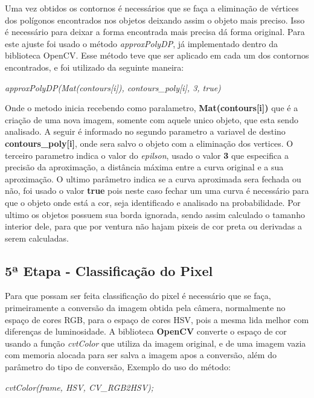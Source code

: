Uma vez obtidos os contornos é necessários que se faça a eliminação de vértices dos polígonos encontrados nos objetos deixando assim o objeto mais preciso. Isso é necessário para deixar a forma encontrada mais precisa dá forma original. Para este ajuste foi usado o método \textit{approxPolyDP}, já implementado dentro da biblioteca OpenCV. Esse método teve que ser aplicado em cada um dos contornos encontrados, e foi utilizado da seguinte maneira:
\begin{center}
\centering \textit{    approxPolyDP(Mat(contours[i]), contours\_poly[i], 3, true)}
\end{center}
 Onde o metodo inicia recebendo como paralametro, \textbf{Mat(contours[i])} que é a criação de uma nova imagem, somente com aquele unico objeto, que esta sendo analisado. A seguir é informado no segundo parametro a variavel de destino \textbf{contours\_poly[i]}, onde sera salvo o objeto com a eliminação dos vertices. O terceiro parametro indica o valor do \textit{epilson}, usado o valor \textbf{3} que especifica a precisão da aproximação, a distância máxima entre a curva original e a sua aproximação\cite{OpenCV}. O ultimo parâmetro indica se a curva aproximada sera fechada ou não, foi usado o valor \textbf{true} pois neste caso fechar um uma curva é necessário para que o objeto onde está a cor, seja identificado e analisado na probabilidade.
 Por ultimo os objetos possuem sua borda ignorada, sendo assim calculado o tamanho interior dele, para que por ventura não hajam pixeis de cor preta ou derivadas a serem calculadas.
 
 \subsection{5ª Etapa - Classificação do Pixel}

 
 
 Para que possam ser feita classificação do pixel é necessário que se faça, primeiramente a conversão da imagem obtida pela câmera, normalmente no espaço de cores RGB, para o espaço de cores HSV, pois a mesma lida melhor com diferenças de luminosidade. 
 A biblioteca \textbf{OpenCV} converte o espaço de cor usando a função \textit{cvtColor} que utiliza da imagem original, e de uma imagem vazia com memoria alocada para ser salva a imagem apos a conversão, além do parâmetro do tipo de conversão, Exemplo do uso do método:
\begin{center}
\centering \textit{cvtColor(frame, HSV, CV\_RGB2HSV);}
\end{center}

